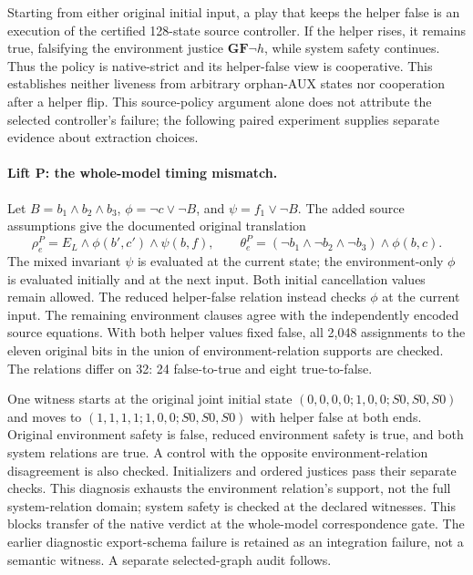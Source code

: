 Starting from either original initial input, a play that keeps the helper
false is an execution of the certified 128-state source controller.
If the helper rises, it remains true, falsifying the environment justice
$\mathbf{G}\mathbf{F}\neg h$, while system safety continues. Thus the
policy is native-strict and its helper-false view is cooperative. This
establishes neither liveness from arbitrary orphan-AUX states nor
cooperation after a helper flip. This source-policy argument alone does
not attribute the selected controller's failure; the following paired
experiment supplies separate evidence about extraction choices.





\paragraph{Lift P: the whole-model timing mismatch.}
Let $B=b_1\land b_2\land b_3$, $\phi=\neg c\lor\neg B$, and
$\psi=f_1\lor\neg B$. The added source assumptions give the documented
original translation
\[
\rho_e^P=E_L\land\phi(b',c')\land\psi(b,f),\qquad
\theta_e^P=(\neg b_1\land\neg b_2\land\neg b_3)\land\phi(b,c).
\]
The mixed invariant $\psi$ is evaluated at the current state; the
environment-only $\phi$ is evaluated initially and at the next input.
Both initial cancellation values remain allowed. The reduced helper-false
relation instead checks $\phi$ at the current input. The remaining environment clauses agree with the
independently encoded source equations. With both helper values fixed
false, all 2,048 assignments to the eleven original bits in the union
of environment-relation supports are checked. The relations differ
on 32: 24 false-to-true and eight true-to-false.

One witness starts at the original joint initial state
$(0,0,0,0;1,0,0;S0,S0,S0)$ and moves to
$(1,1,1,1;1,0,0;S0,S0,S0)$ with helper false at both ends.
Original environment safety is false, reduced environment safety is
true, and both system relations are true. A control with the opposite
environment-relation disagreement is also checked. Initializers and ordered
justices pass their separate checks. This diagnosis exhausts the
environment relation's support, not the full system-relation domain;
system safety is checked at the declared witnesses. This blocks transfer
of the native verdict at the whole-model correspondence gate. The earlier
diagnostic export-schema failure is retained as an integration failure,
not a semantic witness. A separate selected-graph audit follows.

